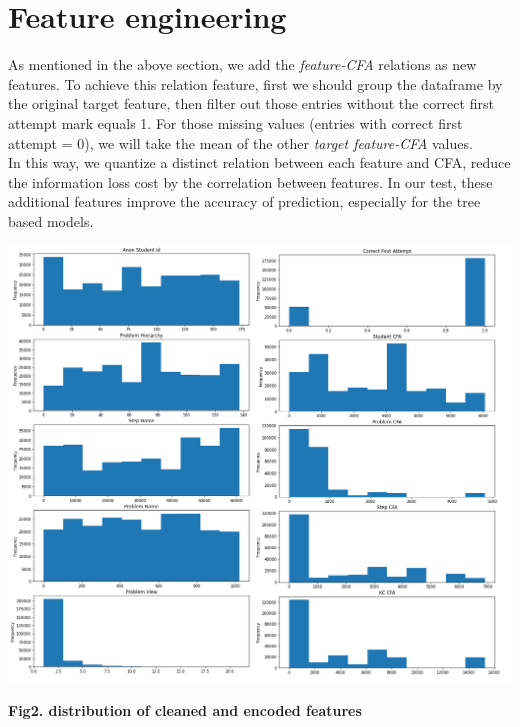 \documentclass{article}
\begin{document}
\section{Feature engineering}
As mentioned in the above section, we add the \textit{feature-CFA} relations as new features. To achieve this relation feature, first we should group the dataframe by the original target feature, then filter out those entries without the correct first attempt mark equals 1. For those missing values (entries with correct first attempt = 0), we will take the mean of the other \textit{target feature-CFA} values.\\
In this way, we quantize a distinct relation between each feature and CFA, reduce the information loss cost by the correlation between features. In our test, these additional features improve the accuracy of prediction, especially for the tree based models.

\graphicspath{ {./images/} }
\includegraphics[scale=0.85]{distribution}
\begin{center} 
\centering
\textbf{Fig2. distribution of cleaned and encoded features}\\
\end{center}
\end{document}
